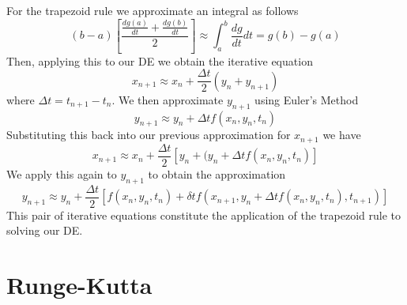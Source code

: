 \documentclass[12pt]{report}
\begin{document}
\begin{proc}{}{}
        For the trapezoid rule we approximate an integral as follows \begin{equation}
                (b-a)\left[\frac{\frac{dg(a)}{dt} + \frac{dg(b)}{dt}}{2}\right] \approx \int_a^b\frac{dg}{dt}dt = g(b) - g(a)
        \end{equation}
        Then, applying this to our DE we obtain the iterative equation \begin{equation}
                x_{n+1} \approx x_n + \frac{\Delta t}{2}\left(y_n + y_{n+1}\right)
        \end{equation}
        where $\Delta t = t_{n+1} - t_n$. We then approximate $y_{n+1}$ using Euler's Method \begin{equation}
                y_{n+1} \approx y_n + \Delta t f(x_n,y_n, t_n)
        \end{equation}
        Substituting this back into our previous approximation for $x_{n+1}$ we have \begin{equation}
                x_{n+1} \approx x_n + \frac{\Delta t}{2}\left[y_n + (y_n + \Delta tf(x_n,y_n,t_n)\right]
        \end{equation}
        We apply this again to $y_{n+1}$ to obtain the approximation \begin{equation}
                y_{n+1} \approx y_n + \frac{\Delta t}{2}\left[f(x_n,y_n,t_n) + \delta tf(x_{n+1},y_n + \Delta tf(x_n,y_n,t_n), t_{n+1})\right]
        \end{equation}
        This pair of iterative equations constitute the application of the trapezoid rule to solving our DE.
\end{proc}


\section{Runge-Kutta}
\end{document}
